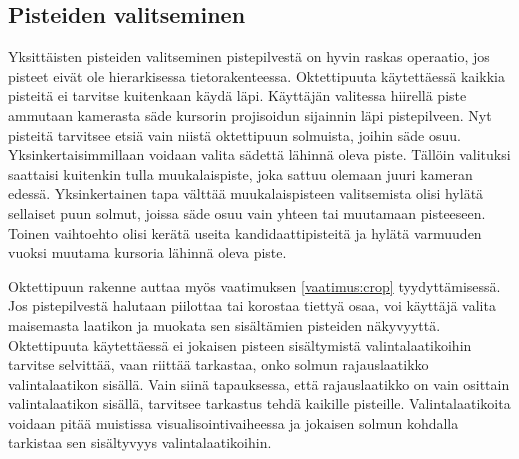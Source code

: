 \subsection{Pisteiden valitseminen}

Yksittäisten pisteiden valitseminen pistepilvestä on hyvin raskas operaatio, jos pisteet eivät ole hierarkisessa tietorakenteessa. Oktettipuuta käytettäessä kaikkia pisteitä ei tarvitse kuitenkaan käydä läpi. Käyttäjän valitessa hiirellä piste ammutaan kamerasta säde kursorin projisoidun sijainnin läpi pistepilveen. Nyt pisteitä tarvitsee etsiä vain niistä oktettipuun solmuista, joihin säde osuu. Yksinkertaisimmillaan voidaan valita sädettä lähinnä oleva piste. Tällöin valituksi saattaisi kuitenkin tulla muukalaispiste, joka sattuu olemaan juuri kameran edessä. Yksinkertainen tapa välttää muukalaispisteen valitsemista olisi hylätä sellaiset puun solmut, joissa säde osuu vain yhteen tai muutamaan pisteeseen. Toinen vaihtoehto olisi kerätä useita kandidaattipisteitä ja hylätä varmuuden vuoksi muutama kursoria lähinnä oleva piste.



Oktettipuun rakenne auttaa myös vaatimuksen \ref{vaatimus:crop} tyydyttämisessä. Jos pistepilvestä halutaan piilottaa tai korostaa tiettyä osaa, voi käyttäjä valita maisemasta laatikon ja muokata sen sisältämien pisteiden näkyvyyttä. Oktettipuuta käytettäessä ei jokaisen pisteen sisältymistä valintalaatikoihin tarvitse selvittää, vaan riittää tarkastaa, onko solmun rajauslaatikko valintalaatikon sisällä. Vain siinä tapauksessa, että rajauslaatikko on vain osittain valintalaatikon sisällä, tarvitsee tarkastus tehdä kaikille pisteille. Valintalaatikoita voidaan pitää muistissa visualisointivaiheessa ja jokaisen solmun kohdalla tarkistaa sen sisältyvyys valintalaatikoihin.

